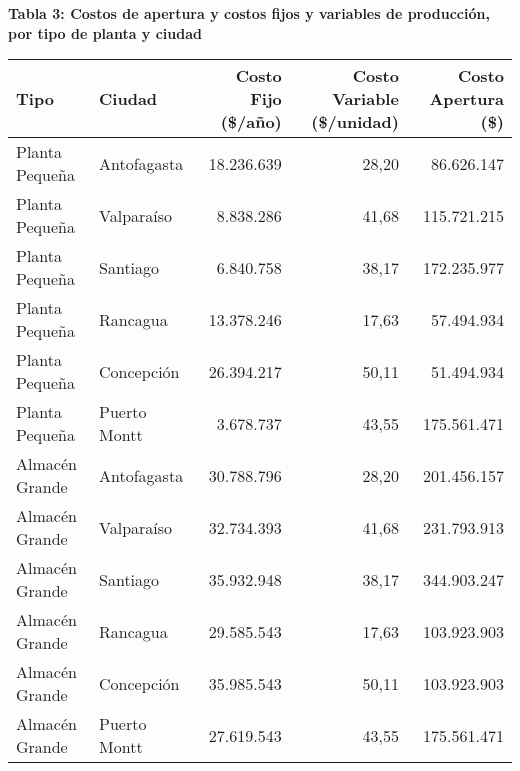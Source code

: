 \documentclass[a4paper]{article}
\begin{document}
        \textbf{Tabla 3: Costos de apertura y costos fijos y variables de producción, por tipo de planta y ciudad}
        \begin{center}
            \begin{tabular}{|l|l|r|r|r|}
                \hline
                Tipo & Ciudad & Costo Fijo (\$/año) & Costo Variable (\$/unidad) & Costo Apertura (\$) \\
                \hline
                Planta Pequeña & Antofagasta & 18.236.639 & 28,20 & 86.626.147 \\
                Planta Pequeña & Valparaíso & 8.838.286 & 41,68 & 115.721.215 \\
                Planta Pequeña & Santiago & 6.840.758 & 38,17 & 172.235.977 \\
                Planta Pequeña & Rancagua & 13.378.246 & 17,63 & 57.494.934 \\
                Planta Pequeña & Concepción & 26.394.217 & 50,11 & 51.494.934 \\
                Planta Pequeña & Puerto Montt & 3.678.737 & 43,55 & 175.561.471 \\
                \hline
                Almacén Grande & Antofagasta & 30.788.796 & 28,20 & 201.456.157 \\
                Almacén Grande & Valparaíso & 32.734.393 & 41,68 & 231.793.913 \\
                Almacén Grande & Santiago & 35.932.948 & 38,17 & 344.903.247 \\
                Almacén Grande & Rancagua & 29.585.543 & 17,63 & 103.923.903 \\
                Almacén Grande & Concepción & 35.985.543 & 50,11 & 103.923.903 \\
                Almacén Grande & Puerto Montt & 27.619.543 & 43,55 & 175.561.471 \\
                \hline
            \end{tabular}
        \end{center}

    \newpage
        \vspace{0.5cm}
        
\end{document}
